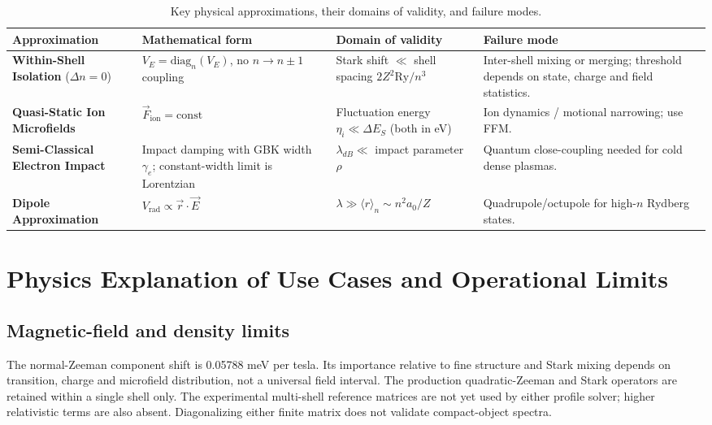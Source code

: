 \documentclass[11pt,a4paper]{article}
\numberwithin{equation}{section}
\begin{document}
\begin{table}[H]
\centering\small
\begin{tabularx}{\textwidth}{@{}XXXX@{}}
\toprule
\textbf{Approximation} & \textbf{Mathematical form} & \textbf{Domain of validity} & \textbf{Failure mode} \\
\midrule
\textbf{Within-Shell Isolation} ($\Delta n = 0$)
  & $V_E = \mathrm{diag}_n(V_E)$, no $n \to n\!\pm\!1$ coupling
  & Stark shift $\ll$ shell spacing $2Z^2\mathrm{Ry}/n^3$
  & Inter-shell mixing or merging; threshold depends on state, charge and field statistics. \\[4pt]
\textbf{Quasi-Static Ion Microfields}
  & $\vec{F}_\mathrm{ion} = \mathrm{const}$
  & Fluctuation energy $\eta_i \ll \Delta E_S$ (both in eV)
  & Ion dynamics / motional narrowing; use FFM. \\[4pt]
\textbf{Semi-Classical Electron Impact}
  & Impact damping with GBK width $\gamma_e$; constant-width limit is Lorentzian
  & $\lambda_{dB} \ll$ impact parameter $\rho$
  & Quantum close-coupling needed for cold dense plasmas. \\[4pt]
\textbf{Dipole Approximation}
  & $V_\mathrm{rad} \propto \vec{r}\cdot\vec{E}$
  & $\lambda \gg \langle r\rangle_n \sim n^2 a_0/Z$
  & Quadrupole/octupole for high-$n$ Rydberg states. \\
\bottomrule
\end{tabularx}
\caption{Key physical approximations, their domains of validity, and failure modes.}
\end{table}


\section{Physics Explanation of Use Cases and Operational Limits}
\label{app:usecases}

\subsection{Magnetic-field and density limits}
The normal-Zeeman component shift is 0.05788 meV per tesla. Its importance
relative to fine structure and Stark mixing depends on transition, charge and
microfield distribution, not a universal field interval. The production
quadratic-Zeeman and Stark operators are retained within a single shell only.
The experimental multi-shell reference matrices are not yet used by either
profile solver; higher relativistic terms are also absent. Diagonalizing either
finite matrix does not validate compact-object spectra.
\end{document}
